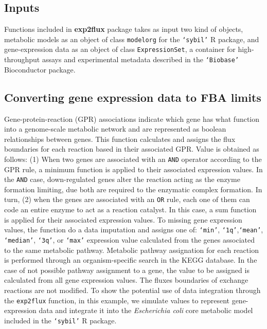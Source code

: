 \subsection*{Inputs}
Functions included in \textbf{exp2flux} package takes as input two kind of objects, metabolic models as an object of class \texttt{modelorg} for the \texttt{`sybil'} R package, and gene-expression data as an object of class \texttt{ExpressionSet}, a container for high-throughput assays and experimental metadata described in the \texttt{`Biobase'} Bioconductor package. 
\subsection*{Converting gene expression data to FBA limits}
Gene-protein-reaction (GPR) associations indicate which gene has what function into a genome-scale metabolic network and are represented as boolean relationships between genes. This function calculates and assigns the flux boundaries for each reaction based in their associated GPR. Value is obtained as follows: (1) When two genes are associated with an \texttt{AND} operator according to the GPR rule, a minimum function is applied to their associated expression values. In the \texttt{AND} case, down-regulated genes alter the reaction acting as the enzyme formation limiting, due both are required to the enzymatic complex formation. In turn, (2) when the genes are associated with an \texttt{OR} rule, each one of them can code an entire enzyme to act as a reaction catalyst. In this case, a sum function is applied for their associated expression values.  To missing gene expression values, the function do a data imputation and assigns one of: \texttt{`min'}, \texttt{`1q'},\texttt{`mean'}, \texttt{`median'}, \texttt{`3q'}, or \texttt{`max'} expression value calculated from the genes associated to the same metabolic pathway. Metabolic pathway assignation for each reaction is performed through an organism-specific search in the KEGG database. In the case of not possible pathway assignment to a gene, the value to be assigned is calculated from all gene expression values. The fluxes boundaries of exchange reactions are not modified.
To show the potential use of data integration through the \texttt{exp2flux} function, in this example, we simulate values to represent gene-expression data and integrate it into the \emph{Escherichia coli} core metabolic model included in the \texttt{`sybil'} R package. \\

